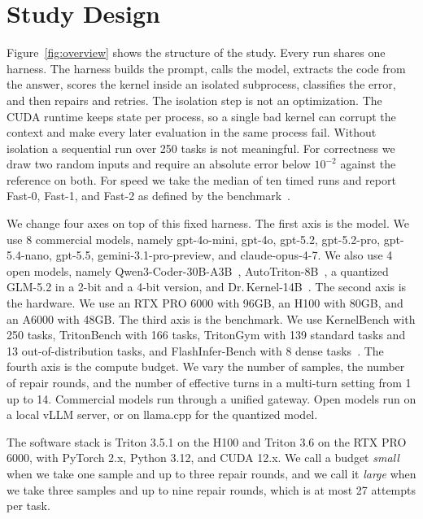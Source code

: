 \documentclass[11pt]{article}
\begin{document}
\section{Study Design}\label{sec:design}



Figure~\ref{fig:overview} shows the structure of the study. Every run shares one harness. The
harness builds the prompt, calls the model, extracts the code from the answer, scores the kernel
inside an isolated subprocess, classifies the error, and then repairs and retries. The isolation
step is not an optimization. The CUDA runtime keeps state per process, so a single bad kernel can
corrupt the context and make every later evaluation in the same process fail. Without isolation a
sequential run over 250 tasks is not meaningful. For correctness we draw two random inputs and
require an absolute error below $10^{-2}$ against the reference on both. For speed we take the median of
ten timed runs and report Fast-0, Fast-1, and Fast-2 as defined by the
benchmark~\citep{ouyang2024kernelbench}.

We change four axes on top of this fixed harness. The first axis is the model. We use 8
commercial models, namely gpt-4o-mini, gpt-4o, gpt-5.2, gpt-5.2-pro, gpt-5.4-nano, gpt-5.5,
gemini-3.1-pro-preview, and claude-opus-4-7. We also use 4 open models, namely
Qwen3-Coder-30B-A3B~\citep{hui2024qwencoder}, AutoTriton-8B~\citep{li2025autotriton}, a quantized
GLM-5.2 in a 2-bit and a 4-bit version, and Dr.\,Kernel-14B~\citep{drkernel2026}. The second axis is
the hardware. We use an RTX PRO 6000 with 96GB, an H100 with 80GB, and an A6000 with 48GB. The
third axis is the benchmark. We use KernelBench with 250 tasks, TritonBench with 166 tasks,
TritonGym with 139 standard tasks and 13 out-of-distribution tasks, and FlashInfer-Bench with 8
dense tasks~\citep{flashinferbench2025}. The fourth axis is the compute budget. We vary the number
of samples, the number of repair rounds, and the number of effective turns in a multi-turn setting
from 1 up to 14. Commercial models run through a unified gateway. Open models run on a local vLLM
server, or on llama.cpp for the quantized model.

The software stack is Triton 3.5.1 on the H100 and Triton 3.6 on the RTX PRO 6000, with PyTorch 2.x,
Python 3.12, and CUDA 12.x. We call a budget \emph{small} when we take one sample and up to three
repair rounds, and we call it \emph{large} when we take three samples and up to nine repair rounds,
which is at most 27 attempts per task.
\end{document}
